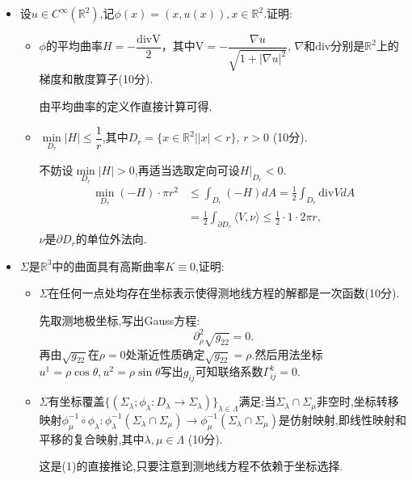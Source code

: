 \begin{itemize}
\begin{proofc}
            直接检验Gauss--Codazzi方程应用曲面论基本定理可得结论.
    \end{proofc}
    \item[6.]设$u\in C^\infty(\mathbb{R}^2)$,记$\phi(x)=(x,u(x)),x \in \mathbb{R}^2$.证明:
    \begin{itemize}
        \item[(1)]$\phi$的平均曲率$H=-\dfrac{\mathrm{div V}}{2}$，其中$\mathrm{V}=-\dfrac{\nabla u}{\sqrt{1+|\nabla u|^2}}$, $\nabla$和$\mathrm{div}$分别是$\mathbb{R}^{2}$上的梯度和散度算子(10分).
        \begin{proofc}
            由平均曲率的定义作直接计算可得.
        \end{proofc}
        \item[(2)]$\min\limits_{D_r}{|H|} \leq \dfrac{1}{r}$,其中$D_r=\{x\in\mathbb{R}^{2}||x|<r\}$, $r>0$ (10分).
        \begin{proofc}
            不妨设$\min\limits_{D_{r}}|H|>0$,再适当选取定向可设$H\big|_{D_{r}}<0$.
            \begin{align*}
                \min_{D_{r}}(-H)\cdot \pi r^{2}&\leq \int_{D_{r}}(-H)dA=\frac{1}{2}\int_{D_{r}}\mathrm{div} V dA\\
                &=\frac{1}{2}\int_{\partial D_{r}}\langle V,\nu\rangle\leq \frac{1}{2}\cdot 1\cdot 2\pi r,
            \end{align*}
            $\nu$是$\partial D_{r}$的单位外法向.
        \end{proofc}
    \end{itemize}

    \item[7.]$\Sigma$是$\mathbb{R}^3$中的曲面具有高斯曲率$K\equiv 0$,证明:
    \begin{itemize}
        \item[(1)]$\Sigma$在任何一点处均存在坐标表示使得测地线方程的解都是一次函数(10分).
        \begin{proofc}
            先取测地极坐标,写出Gauss方程:
            $$
                \partial_{\rho}^{2}\sqrt{g_{22}}=0.
            $$
            再由$\sqrt{g_{22}}$在$\rho=0$处渐近性质确定$\sqrt{g_{22}}=\rho$.然后用法坐标$u^{1}=\rho\cos\theta,u^{2}=\rho\sin\theta$写出$g_{ij}$可知联络系数$\Gamma_{ij}^{k}=0$.
        \end{proofc}
        \item[(2)]$\Sigma$有坐标覆盖$\{(\Sigma_\lambda;\phi_\lambda:D_\lambda\to \Sigma_\lambda)\}_{\lambda\in \Lambda}$满足:当$\Sigma_\lambda\cap \Sigma_\mu$非空时,坐标转移映射$\phi^{-1}_\mu\circ \phi_\lambda:\phi^{-1}_\lambda(\Sigma_\lambda\cap \Sigma_\mu)\to \phi^{-1}_\mu (\Sigma_\lambda\cap \Sigma_\mu)$是仿射映射,即线性映射和平移的复合映射,其中$\lambda,\mu\in\Lambda$ (10分).
        \begin{proofc}
            这是(1)的直接推论,只要注意到测地线方程不依赖于坐标选择.
        \end{proofc}
    \end{itemize}
\end{itemize}










